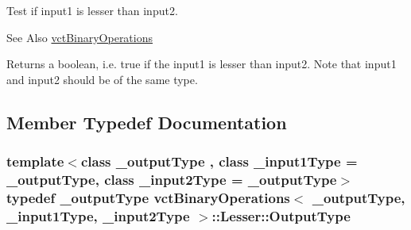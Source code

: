 Test if input1 is lesser than input2. 

\begin{DoxySeeAlso}{See Also}
\hyperlink{classvct_binary_operations}{vct\-Binary\-Operations}
\end{DoxySeeAlso}
Returns a boolean, i.\-e. true if the input1 is lesser than input2. Note that input1 and input2 should be of the same type. 

\subsection{Member Typedef Documentation}
\hypertarget{classvct_binary_operations_1_1_lesser_a3f6be40aec12d4a06f0a16d729f765da}{
\subsubsection[{Output\-Type}]{\setlength{\rightskip}{0pt plus 5cm}template$<$class \-\_\-output\-Type , class \-\_\-input1\-Type  = \-\_\-output\-Type, class \-\_\-input2\-Type  = \-\_\-output\-Type$>$ typedef \-\_\-output\-Type {\bf vct\-Binary\-Operations}$<$ \-\_\-output\-Type, \-\_\-input1\-Type, \-\_\-input2\-Type $>$\-::{\bf Lesser\-::\-Output\-Type}}}\label{classvct_binary_operations_1_1_lesser_a3f6be40aec12d4a06f0a16d729f765da}


